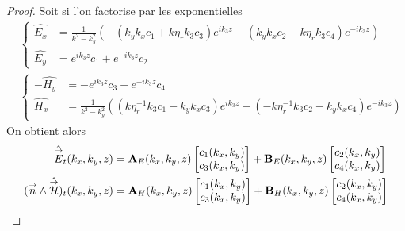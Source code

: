\begin{proof}
        Soit si l'on factorise par les exponentielles
        \begin{align*}
          &\left\lbrace
          \begin{aligned}
            \hat{E_x} &= \frac{1}{k^2 - k_y^2}\left(-\left(k_yk_x c_1 + k\eta_r k_3 c_3 \right)e^{ik_3z} - \left(k_yk_xc_2 -k\eta_r k_3 c_4\right)e^{-ik_3z}\right)
            \\
            \hat{E_y} &= e^{ik_3z}c_1 + e^{-ik_3z}c_2
          \end{aligned}
          \right.
          \\
          &\left\lbrace
          \begin{aligned}
            -\hat{H_y} &= -e^{ik_3z}c_3 - e^{-ik_3z}c_4
            \\
            \hat{H_x} &= \frac{1}{k^2 - k_y^2}\left(\left(k\eta_r^{-1} k_3c_1 - k_y k_x c_3\right)e^{ik_3z} + \left(-k\eta_r^{-1} k_3c_2 - k_y k_x c_4\right)e^{-ik_3z}\right)
          \end{aligned}
          \right.
        \end{align*}
        On obtient alors
        \begin{align*}
            \hat{{\overset{\rightarrow}{E}}}_t(k_x,k_y,z) &= \mathbf{A}_E(k_x,k_y,z) \begin{bmatrix}c_1(k_x,k_y) \\ c_3(k_x,k_y)\end{bmatrix} + \mathbf{B}_E(k_x,k_y,z) \begin{bmatrix}c_2(k_x,k_y) \\ c_4(k_x,k_y)\end{bmatrix}
            \\
            ({\overset{\rightarrow}{n}} \wedge \hat{{\overset{\rightarrow}{\mathcal{H}}}})_t(k_x,k_y,z) &= \mathbf{A}_H(k_x,k_y,z) \begin{bmatrix}c_1(k_x,k_y) \\ c_3(k_x,k_y)\end{bmatrix} + \mathbf{B}_H(k_x,k_y,z) \begin{bmatrix}c_2(k_x,k_y) \\ c_4(k_x,k_y)\end{bmatrix}
        \end{align*}
      \end{proof}


